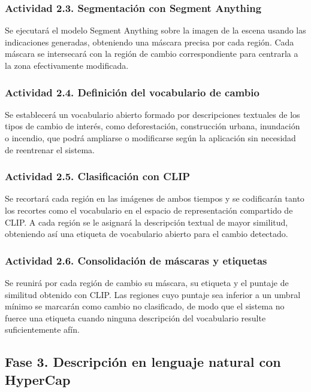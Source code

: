 \subsubsection{Actividad 2.3. Segmentación con Segment Anything}

Se ejecutará el modelo Segment Anything sobre la imagen de la escena usando las indicaciones generadas, obteniendo una máscara precisa por cada región. Cada máscara se intersecará con la región de cambio correspondiente para centrarla a la zona efectivamente modificada.

\subsubsection{Actividad 2.4. Definición del vocabulario de cambio}

Se establecerá un vocabulario abierto formado por descripciones textuales de los tipos de cambio de interés, como deforestación, construcción urbana, inundación o incendio, que podrá ampliarse o modificarse según la aplicación sin necesidad de reentrenar el sistema.

\subsubsection{Actividad 2.5. Clasificación con CLIP}

Se recortará cada región en las imágenes de ambos tiempos y se codificarán tanto los recortes como el vocabulario en el espacio de representación compartido de CLIP. A cada región se le asignará la descripción textual de mayor similitud, obteniendo así una etiqueta de vocabulario abierto para el cambio detectado.

\subsubsection{Actividad 2.6. Consolidación de máscaras y etiquetas}

Se reunirá por cada región de cambio su máscara, su etiqueta y el puntaje de similitud obtenido con CLIP. Las regiones cuyo puntaje sea inferior a un umbral mínimo se marcarán como cambio no clasificado, de modo que el sistema no fuerce una etiqueta cuando ninguna descripción del vocabulario resulte suficientemente afín.

\subsection{Fase 3. Descripción en lenguaje natural con HyperCap}

